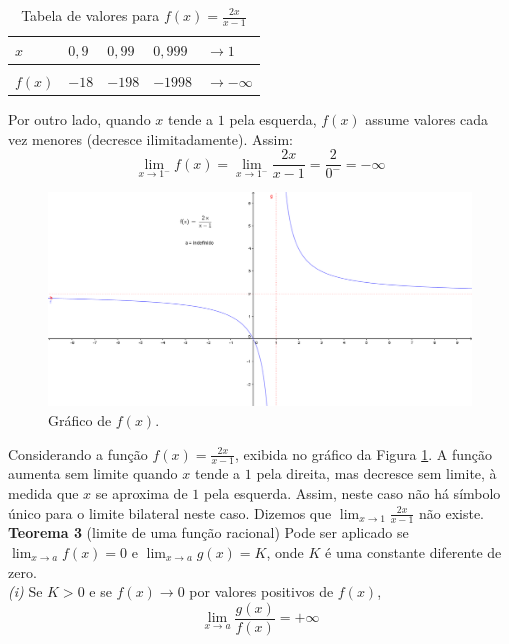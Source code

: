 \begin{table}[H]
\centering
\caption{Tabela de valores para $\displaystyle f(x) = \frac{2x}{x-1}$}
\label{tab:tab2}
\smallskip
\begin{tabular}{l|l|l|l|l}
\hline
 $x$ & $0,9$ & $0,99$ & $0,999$ & $\to 1$ \\[0.5ex]
\hline
&&&&\\[-2ex]
$f(x)$ & $-18$ &  $-198$ &  $-1998$& $\to - \infty$\\[0.5ex]
\hline
\end{tabular}
\end{table}
Por outro lado, quando $x$ tende a $1$ pela esquerda, $f(x)$ assume valores cada vez menores (decresce ilimitadamente). Assim:
$$
\lim_{x \to 1^-} f(x) = \lim_{x \to 1^-}  \frac{2x}{x-1} = \frac{2}{0^-} = - \infty
$$
\begin{figure}[H]
\centering %
\includegraphics[width=15cm]{img/graph5.png} %
\caption{Gráfico de $f(x)$.}
\label{fig:graph5}
\end{figure}
Considerando a função $\displaystyle f(x) = \frac{2x}{x-1}$, exibida no gráfico da Figura \ref{fig:graph5}. A função aumenta sem limite quando $x$ tende a $1$ pela direita, mas decresce sem limite, à medida que $x$ se aproxima de $1$ pela esquerda. Assim, neste caso não há símbolo único para o limite bilateral neste caso. Dizemos que $\displaystyle \lim_{x \to 1} \frac{2x}{x-1}$ não existe.\\

\textbf{Teorema 3} (limite de uma função racional) Pode ser aplicado se $\displaystyle \lim_{x \to a} f(x) = 0$ e $\displaystyle \lim_{x \to a} g(x) = K$, onde $K$ é uma constante diferente de zero.\\

\textit{(i)} Se $K > 0$  e se $f(x) \to 0$ por valores positivos de $f(x)$,
$$
\lim_{x \to a} \frac{g(x)}{f(x)} = + \infty
$$

